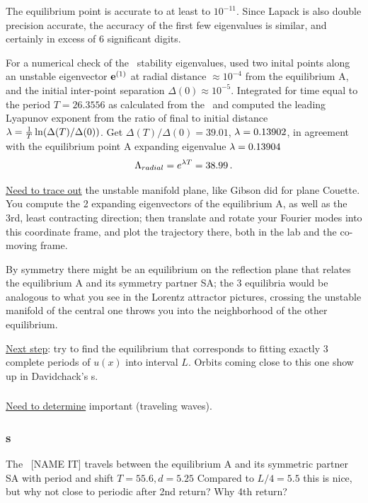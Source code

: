 The equilibrium point is accurate to at least to $10^{-11}$. Since
Lapack is also double precision accurate, the accuracy of the first
few eigenvalues is similar, and certainly in
excess of 6 significant digits.



For a numerical check of the \rpo\ stability eigenvalues,
used two inital
points along an unstable eigenvector ${\bf e}^{(1)}$
at radial distance  $\approx 10^{-4}$ from the equilibrium A,
and the initial inter-point separation $\Delta(0) \approx 10^{-5}$.
Integrated for time equal to the period $T=26.3556$ as calculated from
the \jacobianM\ and computed the leading Lyapunov exponent from the ratio of
final to initial distance 
$\lambda= {1 \over T}\ln( \Delta(T)/\Delta(0))$.
Get
$\Delta(T)/\Delta(0) =39.01$,
$\lambda=0.13902$, in agreement with the equilibrium point A 
expanding eigenvalue $\lambda=0.13904$
\[
\Lambda_{radial} =  e^{\lambda T} =38.99
\,.
\]

\underline{Need to trace out}
the unstable manifold plane, like Gibson did for plane Couette.
You compute the 2 expanding eigenvectors of the
equilibrium A, as well as the 3rd, least contracting direction; then
translate and rotate your Fourier modes into this coordinate frame,
and plot the trajectory there, both in the lab and the co-moving frame.

By symmetry there might be an equilibrium on the reflection plane that
relates the equilibrium A and its symmetry partner SA; the 3 equilibria would
be analogous to what you see in the Lorentz attractor pictures, crossing
the unstable manifold of the central one throws you into the neighborhood
of the other equilibrium.

\underline{Next step}: try to find the equilibrium that corresponds to fitting
exactly 3 complete periods of $u(x)$ into interval $L$.
Orbits coming close to this one
show up in Davidchack's \rpo s.

\subsubsection{\Reqva}

\underline{Need to determine} important {\Reqva} (traveling waves).

\subsubsection{\Rpo s}


The \rpo\ [NAME IT] travels between the equilibrium A and its symmetric partner SA 
with period and shift
$T=55.6, d=5.25$
Compared to $L/4 = 5.5$
this is nice, but why not close to periodic after 2nd return? Why 4th return?


